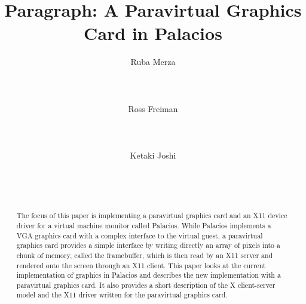 \documentclass{acm_proc_article-sp}
\begin{document}
\title{Paragraph: A Paravirtual Graphics Card in Palacios}
\author{
\alignauthor
Ruba Merza\\
       \\
       \\
       \\
\alignauthor
Ross Freiman\\
       \\
       \\
       \\
\alignauthor
Ketaki Joshi\\
       \\
       \\
       \\
}

\maketitle
\begin{abstract}
The focus of this paper is implementing a paravirtual graphics card and an X11 device driver for
a virtual machine monitor called Palacios. While Palacios implements a VGA graphics card with
a complex interface to the virtual guest, a paravirtual graphics card provides a simple interface
by writing directly an array of pixels into a chunk of memory, called the framebuffer, which is then
read by an X11 server and rendered onto the screen through an X11 client.
This paper looks at the current implementation of graphics in Palacios and describes the new
implementation with a paravirtual graphics card. It also provides a short description of the X 
client-server model and the X11 driver written for the paravirtual graphics card.
\end{abstract}

\end{document}

